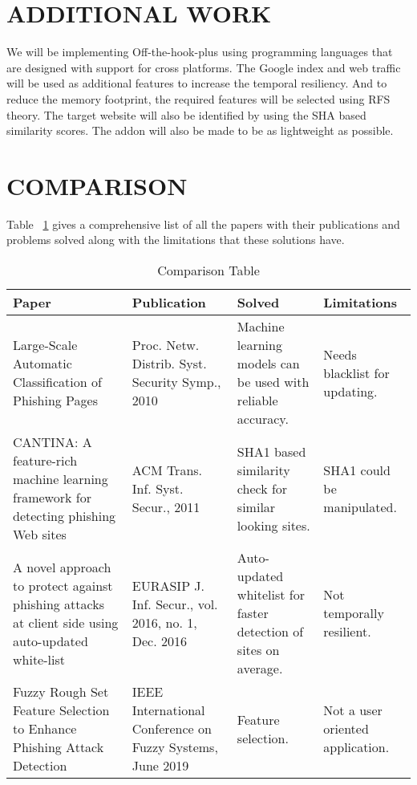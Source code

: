 \section{ADDITIONAL WORK}
We will be implementing Off-the-hook-plus using programming languages that are designed with support for cross platforms. The Google index and web traffic will be used as additional features to increase the temporal resiliency. And to reduce the memory footprint, the required features will be selected using RFS theory. The target website will also be identified by using the SHA based similarity scores. The addon will also be made to be as lightweight as possible.

\section{COMPARISON}
Table ~\ref{tab:ct} gives a comprehensive list of all the papers with their publications and problems solved along with the limitations that these solutions have.

\begin{table}[h!]
\caption{Comparison Table}
\centering
    \begin{tabular}{ |m{3cm}|m{3cm}|m{4cm}|m{4cm}| }
    \hline
    Paper & Publication & Solved & Limitations \\ \hline
    Large-Scale Automatic Classification of Phishing Pages & Proc. Netw. Distrib. Syst. Security Symp., 2010 & Machine learning models can be used with reliable accuracy. & Needs blacklist for updating. \\ \hline
    CANTINA: A feature-rich machine learning framework for detecting phishing Web sites & ACM Trans. Inf. Syst. Secur., 2011 & SHA1 based similarity check for similar looking sites. & SHA1 could be manipulated. \\ \hline
    A novel approach to protect against phishing attacks at client side using auto-updated white-list & EURASIP J. Inf. Secur., vol. 2016, no. 1, Dec. 2016 & Auto-updated whitelist for faster detection of sites on average. & Not temporally resilient. \\ \hline
    Fuzzy Rough Set Feature Selection to Enhance Phishing Attack Detection & IEEE International Conference on Fuzzy Systems, June 2019 & Feature selection. & Not a user oriented application. \\ \hline
    \end{tabular}
\label{tab:ct}
\end{table}